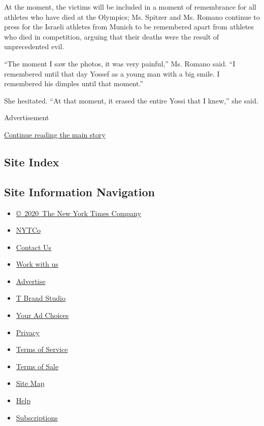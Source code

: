 At the moment, the victims will be included in a moment of remembrance
for all athletes who have died at the Olympics; Ms. Spitzer and Ms.
Romano continue to press for the Israeli athletes from Munich to be
remembered apart from athletes who died in competition, arguing that
their deaths were the result of unprecedented evil.

``The moment I saw the photos, it was very painful,'' Ms. Romano said.
``I remembered until that day Yossef as a young man with a big smile. I
remembered his dimples until that moment.''

She hesitated. ``At that moment, it erased the entire Yossi that I
knew,'' she said.

Advertisement

\protect\hyperlink{after-bottom}{Continue reading the main story}

\hypertarget{site-index}{%
\subsection{Site Index}\label{site-index}}

\hypertarget{site-information-navigation}{%
\subsection{Site Information
Navigation}\label{site-information-navigation}}

\begin{itemize}
\tightlist
\item
  \href{https://help.nytimes3xbfgragh.onion/hc/en-us/articles/115014792127-Copyright-notice}{©~2020~The
  New York Times Company}
\end{itemize}

\begin{itemize}
\tightlist
\item
  \href{https://www.nytco.com/}{NYTCo}
\item
  \href{https://help.nytimes3xbfgragh.onion/hc/en-us/articles/115015385887-Contact-Us}{Contact
  Us}
\item
  \href{https://www.nytco.com/careers/}{Work with us}
\item
  \href{https://nytmediakit.com/}{Advertise}
\item
  \href{http://www.tbrandstudio.com/}{T Brand Studio}
\item
  \href{https://www.nytimes3xbfgragh.onion/privacy/cookie-policy\#how-do-i-manage-trackers}{Your
  Ad Choices}
\item
  \href{https://www.nytimes3xbfgragh.onion/privacy}{Privacy}
\item
  \href{https://help.nytimes3xbfgragh.onion/hc/en-us/articles/115014893428-Terms-of-service}{Terms
  of Service}
\item
  \href{https://help.nytimes3xbfgragh.onion/hc/en-us/articles/115014893968-Terms-of-sale}{Terms
  of Sale}
\item
  \href{https://spiderbites.nytimes3xbfgragh.onion}{Site Map}
\item
  \href{https://help.nytimes3xbfgragh.onion/hc/en-us}{Help}
\item
  \href{https://www.nytimes3xbfgragh.onion/subscription?campaignId=37WXW}{Subscriptions}
\end{itemize}
